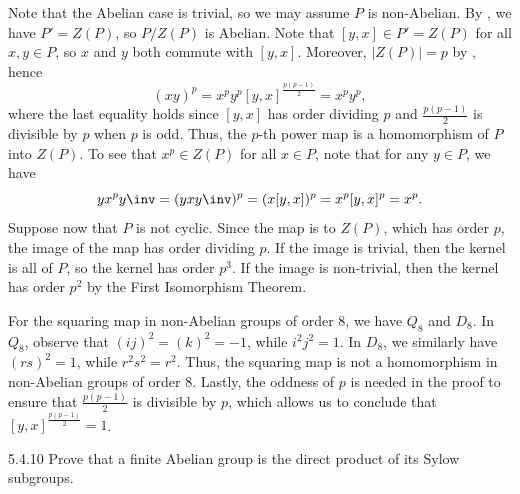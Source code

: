 \begin{sol}
    Note that the Abelian case is trivial, so we may assume $P$ is non-Abelian.
	By , we have $P' = Z(P)$, so $P/Z(P)$ is Abelian.
	Note that $[y, x] \in P' = Z(P)$ for all $x, y \in P$, so $x$ and $y$ both commute with $[y, x]$.
	Moreover, $|Z(P)| = p$ by , hence
    \[
    	(xy)^p = x^p y^p [y, x]^{\frac{p(p-1)}{2}} = x^p y^p,
    \]
    where the last equality holds since $[y, x]$ has order dividing $p$ and $\frac{p(p-1)}{2}$ is divisible by $p$ when $p$ is odd.
	Thus, the $p$-th power map is a homomorphism of $P$ into $Z(P)$.
	To see that $x^p \in Z(P)$ for all $x \in P$, note that for any $y \in P$, we have
    \[
    	y x^py\inv = (y x y\inv)^p = (x [y, x])^p = x^p [y, x]^p = x^p.
    \]
    Suppose now that $P$ is not cyclic.
	Since the map is to $Z(P)$, which has order $p$, the image of the map has order dividing $p$.
	If the image is trivial, then the kernel is all of $P$, so the kernel has order $p^3$.
	If the image is non-trivial, then the kernel has order $p^2$ by the First Isomorphism Theorem.

    For the squaring map in non-Abelian groups of order 8, we have $Q_8$ and $D_8$.
	In $Q_8$, observe that $(ij)^2 = (k)^2 = -1$, while $i^2j^2 = 1$.
	In $D_8$, we similarly have $(rs)^2 = 1$, while $r^2s^2 = r^2$.
	Thus, the squaring map is not a homomorphism in non-Abelian groups of order 8.
	Lastly, the oddness of $p$ is needed in the proof to ensure that $\frac{p(p-1)}{2}$ is divisible by $p$, which allows us to conclude that $[y, x]^{\frac{p(p-1)}{2}} = 1$.
\end{sol}

\begin{spex}{5.4.10}
    Prove that a finite Abelian group is the direct product of its Sylow subgroups.
\end{spex}

